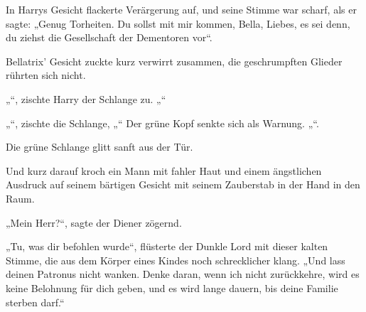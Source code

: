 In Harrys Gesicht flackerte Verärgerung auf, und seine Stimme war scharf, als er sagte: „Genug Torheiten. Du sollst mit mir kommen, Bella, Liebes, es sei denn, du ziehst die Gesellschaft der Dementoren vor“.

Bellatrix' Gesicht zuckte kurz verwirrt zusammen, die geschrumpften Glieder rührten sich nicht.

„“, zischte Harry der Schlange zu. „“

„“, zischte die Schlange, „“ Der grüne Kopf senkte sich als Warnung. „“.

Die grüne Schlange glitt sanft aus der Tür.

Und kurz darauf kroch ein Mann mit fahler Haut und einem ängstlichen Ausdruck auf seinem bärtigen Gesicht mit seinem Zauberstab in der Hand in den Raum.

„Mein Herr?“, sagte der Diener zögernd.

„Tu, was dir befohlen wurde“, flüsterte der Dunkle Lord mit dieser kalten Stimme, die aus dem Körper eines Kindes noch schrecklicher klang. „Und lass deinen Patronus nicht wanken. Denke daran, wenn ich nicht zurückkehre, wird es keine Belohnung für dich geben, und es wird lange dauern, bis deine Familie sterben darf.“

